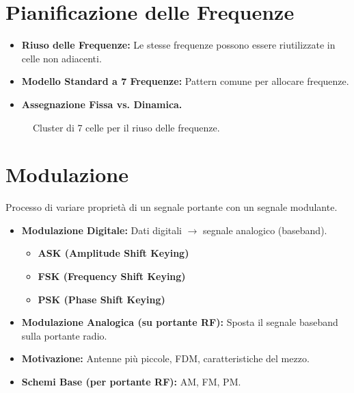 \section{Pianificazione delle Frequenze}
\begin{itemize}
    \item \textbf{Riuso delle Frequenze:} Le stesse frequenze possono essere riutilizzate in celle non adiacenti.
    \item \textbf{Modello Standard a 7 Frequenze:} Pattern comune per allocare frequenze.
    \item \textbf{Assegnazione Fissa vs. Dinamica.}
\end{itemize}
\begin{figure}[H]
\centering
{}
\caption{Cluster di 7 celle per il riuso delle frequenze.}
\label{fig:frequency_planning}
\end{figure}

\section{Modulazione}
Processo di variare proprietà di un segnale portante con un segnale modulante.
\begin{itemize}
    \item \textbf{Modulazione Digitale:} Dati digitali $\rightarrow$ segnale analogico (baseband).
    \begin{itemize}
        \item \textbf{ASK (Amplitude Shift Keying)}
        \item \textbf{FSK (Frequency Shift Keying)}
        \item \textbf{PSK (Phase Shift Keying)}
    \end{itemize}
    \item \textbf{Modulazione Analogica (su portante RF):} Sposta il segnale baseband sulla portante radio.
    \item \textbf{Motivazione:} Antenne più piccole, FDM, caratteristiche del mezzo.
    \item \textbf{Schemi Base (per portante RF):} AM, FM, PM.
\end{itemize}

